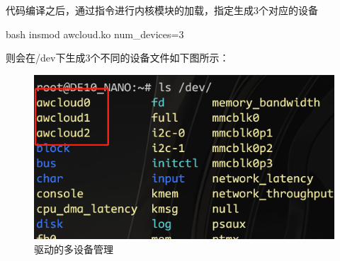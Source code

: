 代码编译之后，通过指令进行内核模块的加载，指定生成3个对应的设备
\begin{code-block}{bash}
insmod awcloud.ko num_devices=3
\end{code-block}
则会在/dev下生成3个不同的设备文件如下图所示：
\begin{figure}[H]
  \centering
  \includegraphics[scale=0.5]{multi_devices.png}
  \caption{驱动的多设备管理}
  \label{fig:multi_devices}
\end{figure}

